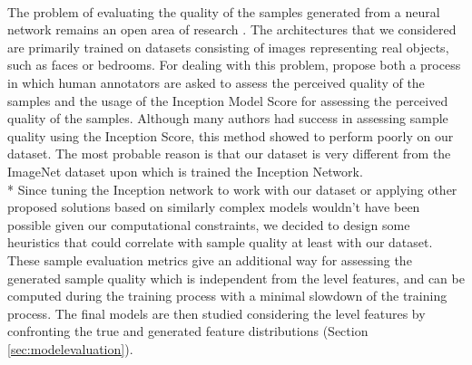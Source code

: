 \paragraph{} The problem of evaluating the quality of the samples generated from a neural network remains an open area of research \cite{improved_gan}. The architectures that we considered are primarily trained on datasets consisting of images representing real objects, such as faces or bedrooms. For dealing with this problem, \citeauthor{improved_gan} propose both a process in which human annotators are asked to assess the perceived quality of the samples \cite[p.~4]{improved_gan} and the usage of the Inception Model \cite{inception} Score for assessing the perceived quality of the samples. Although many authors had success in assessing sample quality using the Inception Score, this method showed to perform poorly on our dataset. The most probable reason is that our dataset is very different from the ImageNet dataset upon which is trained the Inception Network. \\* Since tuning the Inception network to work with our dataset or applying other proposed solutions based on similarly complex models wouldn't have been possible given our computational constraints, we decided to design some heuristics that could correlate with sample quality at least with our dataset. These sample evaluation metrics give an additional way for assessing the generated sample quality which is independent from the level features, and can be computed during the training process with a minimal slowdown of the training process. The final models are then studied considering the level features by confronting the true and generated feature distributions (Section \ref{sec:modelevaluation}).

